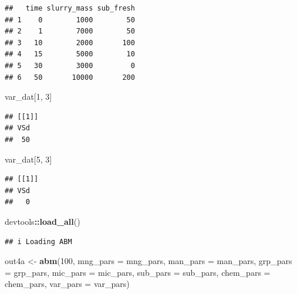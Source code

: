 \documentclass[
]{article}
\newenvironment{Shaded}{\begin{snugshade}}{\end{snugshade}}
\newcommand{\AttributeTok}[1]{\textcolor[rgb]{0.13,0.29,0.53}{#1}}
\newcommand{\DecValTok}[1]{\textcolor[rgb]{0.00,0.00,0.81}{#1}}
\newcommand{\FunctionTok}[1]{\textcolor[rgb]{0.13,0.29,0.53}{\textbf{#1}}}
\newcommand{\NormalTok}[1]{#1}
\newcommand{\OtherTok}[1]{\textcolor[rgb]{0.56,0.35,0.01}{#1}}
\newcommand{\SpecialCharTok}[1]{\textcolor[rgb]{0.81,0.36,0.00}{\textbf{#1}}}
\begin{document}
\begin{verbatim}
##   time slurry_mass sub_fresh
## 1    0        1000        50
## 2    1        7000        50
## 3   10        2000       100
## 4   15        5000        10
## 5   30        3000         0
## 6   50       10000       200
\end{verbatim}

\begin{Shaded}
\begin{Highlighting}[]
\NormalTok{var\_dat[}\DecValTok{1}\NormalTok{, }\DecValTok{3}\NormalTok{]}
\end{Highlighting}
\end{Shaded}

\begin{verbatim}
## [[1]]
## VSd 
##  50
\end{verbatim}

\begin{Shaded}
\begin{Highlighting}[]
\NormalTok{var\_dat[}\DecValTok{5}\NormalTok{, }\DecValTok{3}\NormalTok{]}
\end{Highlighting}
\end{Shaded}

\begin{verbatim}
## [[1]]
## VSd 
##   0
\end{verbatim}

\begin{Shaded}
\begin{Highlighting}[]
\NormalTok{devtools}\SpecialCharTok{::}\FunctionTok{load\_all}\NormalTok{()}
\end{Highlighting}
\end{Shaded}

\begin{verbatim}
## i Loading ABM
\end{verbatim}

\begin{Shaded}
\begin{Highlighting}[]
\NormalTok{out4a }\OtherTok{\textless{}{-}} \FunctionTok{abm}\NormalTok{(}\DecValTok{100}\NormalTok{,}
             \AttributeTok{mng\_pars =}\NormalTok{ mng\_pars,}
             \AttributeTok{man\_pars =}\NormalTok{ man\_pars,}
             \AttributeTok{grp\_pars =}\NormalTok{ grp\_pars,}
             \AttributeTok{mic\_pars =}\NormalTok{ mic\_pars,}
             \AttributeTok{sub\_pars =}\NormalTok{ sub\_pars,}
             \AttributeTok{chem\_pars =}\NormalTok{ chem\_pars,}
             \AttributeTok{var\_pars =}\NormalTok{ var\_pars)}
\end{Highlighting}
\end{Shaded}
\end{document}
